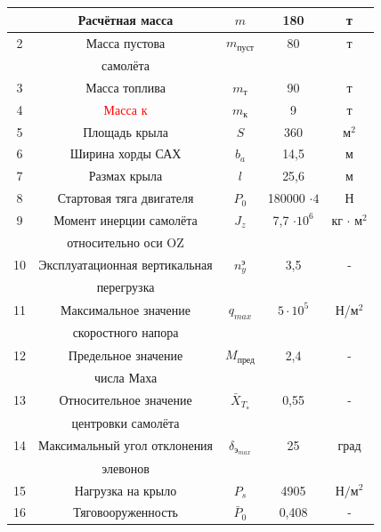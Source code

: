 \begin{longtable}[H]{|c|c|c|c|c|}
    \hline \hline
    \endlastfoot
         \hline
        1 & Расчётная масса & $m$ & 180 & т\\ \hline
        2 & Масса пустова & $m_\text{пуст}$ & 80 & т\\
         & самолёта &  &  & \\ \hline
        3 & Масса топлива & $m_\text{т}$ & 90 & т\\ \hline
        4 & \textcolor{red}{Масса к} & $m_\text{к}$ & 9 & т\\ \hline
        5 & Площадь крыла & $S$ & 360 & м$^2$\\ \hline
        6 & Ширина хорды САХ & $b_a$& 14,5 & м\\ \hline
        7 & Размах крыла & $l$ & 25,6 & м\\ \hline
        8 & Стартовая тяга двигателя & $P_0$ & 180000 $\cdot 4$ & Н\\ \hline
        9 & Момент инерции самолёта& $J_z$ & 7,7 $\cdot 10^{6}$ & кг $\cdot$ м$^2$ \\ 
         & относительно оси OZ &  &  & \\ \hline
        10 & Эксплуатационная вертикальная & $n_y^\text{э}$ & 3,5 & -\\ 
         & перегрузка &  &  & \\ \hline
        11 & Максимальное значение & $q_{max}$ & $5 \cdot 10^5$ & Н/м$^2$\\ 
         & скоростного напора &  &  & \\ \hline
        12 & Предельное значение & $M_\text{пред}$ & 2,4 & -\\ 
         & числа Маха &  &  & \\ \hline
        13 & Относительное значение & $\bar{X}_{T_\text{э}}$ & 0,55 & -\\ 
         & центровки самолёта &  &  & \\ \hline
        14 & Максимальный угол отклонения & $\delta_{\text{э}_{max}}$ & 25 &град \\ 
        & элевонов & & & \\ \hline
        15 & Нагрузка на крыло & $P_s$ & 4905 & ${\text{Н}}/{\text{м}^2}$ \\ \hline
        16 & Тяговооруженность & $\bar{P}_0$ & 0,408 & - \\ \hline

\end{longtable}

